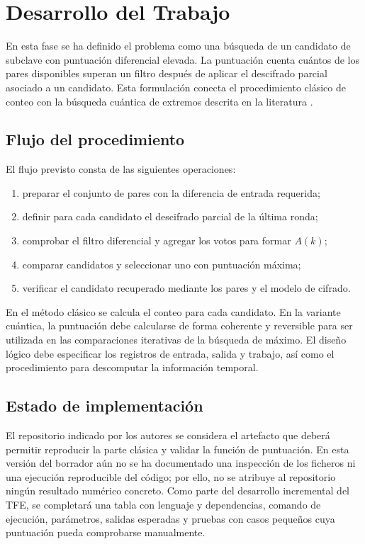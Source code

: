 \chapter{Desarrollo del Trabajo}

En esta fase se ha definido el problema como una búsqueda de un candidato de subclave con puntuación diferencial elevada. La puntuación cuenta cuántos de los pares disponibles superan un filtro después de aplicar el descifrado parcial asociado a un candidato. Esta formulación conecta el procedimiento clásico de conteo con la búsqueda cuántica de extremos descrita en la literatura \citep{zhou2019}.

\section{Flujo del procedimiento}

El flujo previsto consta de las siguientes operaciones:
\begin{enumerate}
 \item preparar el conjunto de pares con la diferencia de entrada requerida;
 \item definir para cada candidato el descifrado parcial de la última ronda;
 \item comprobar el filtro diferencial y agregar los votos para formar \(A(k)\);
 \item comparar candidatos y seleccionar uno con puntuación máxima;
 \item verificar el candidato recuperado mediante los pares y el modelo de cifrado.
\end{enumerate}

En el método clásico se calcula el conteo para cada candidato. En la variante cuántica, la puntuación debe calcularse de forma coherente y reversible para ser utilizada en las comparaciones iterativas de la búsqueda de máximo. El diseño lógico debe especificar los registros de entrada, salida y trabajo, así como el procedimiento para descomputar la información temporal.

\section{Estado de implementación}

El repositorio indicado por los autores se considera el artefacto que deberá permitir reproducir la parte clásica y validar la función de puntuación. En esta versión del borrador aún no se ha documentado una inspección de los ficheros ni una ejecución reproducible del código; por ello, no se atribuye al repositorio ningún resultado numérico concreto. Como parte del desarrollo incremental del TFE, se completará una tabla con lenguaje y dependencias, comando de ejecución, parámetros, salidas esperadas y pruebas con casos pequeños cuya puntuación pueda comprobarse manualmente.

